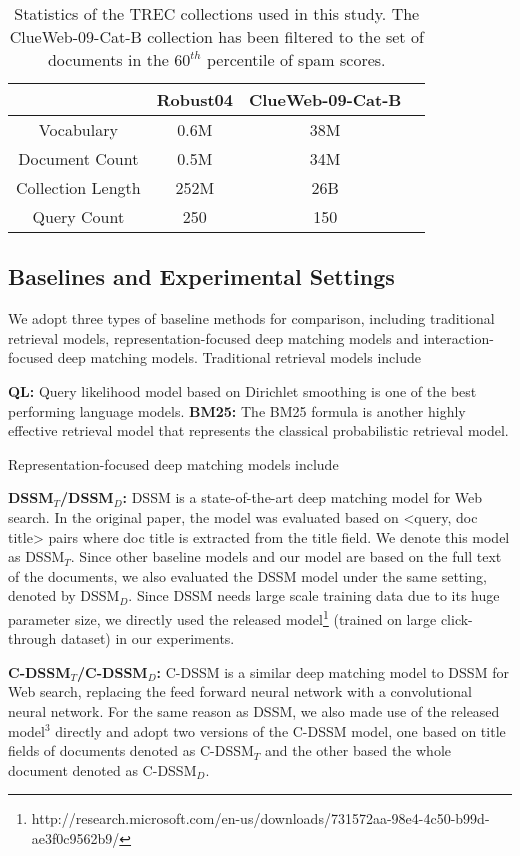 \documentclass{sig-alternate-05-2015}
\begin{document}
\begin{table}
  \centering
  \caption{Statistics of the TREC collections used in this study. The ClueWeb-09-Cat-B collection has been filtered to the set of documents in the $60^{th}$ percentile of spam scores.}
  \begin{tabular}{c c c c}
  \hline
    & Robust04 &   ClueWeb-09-Cat-B \\\hline
    Vocabulary & 0.6M & 38M  \\
    Document Count & 0.5M   & 34M  \\
    Collection Length & 252M  & 26B  \\
    Query Count & 250 & 150\\\hline
  \end{tabular}
  \label{tab:data_stats}
\end{table}

\subsection{Baselines and Experimental Settings}
We adopt three types of baseline methods for comparison, including traditional retrieval models, representation-focused deep matching models and interaction-focused deep matching models. Traditional retrieval models include

\textbf{QL:} Query likelihood model based on Dirichlet smoothing \cite{zhai2001study} is one of the best performing language models. 
\textbf{BM25:} The BM25 formula \cite{robertson1994some} is another highly effective retrieval model that represents the classical probabilistic retrieval model.

Representation-focused deep matching models include

\textbf{DSSM$_T$/DSSM$_D$:} DSSM \cite{huang2013learning} is a state-of-the-art deep matching model for Web search. In the original paper, the model was evaluated based on <query, doc title> pairs where doc title is extracted from the title field. We denote this model as DSSM$_T$. Since other baseline models and our model are based on the full text of the documents, we also evaluated the DSSM model under the same setting, denoted by DSSM$_D$. Since DSSM needs large scale training data due to its huge parameter size, we directly used the released model\footnote{http://research.microsoft.com/en-us/downloads/731572aa-98e4-4c50-b99d-ae3f0c9562b9/} (trained on large click-through dataset) in our experiments.

\textbf{C-DSSM$_T$/C-DSSM$_D$:} C-DSSM \cite{shen2014learning,gao2015modeling} is a similar deep matching model to DSSM for Web search, replacing the feed forward neural network with a convolutional neural network. For the same reason as DSSM, we also made use of the released model$^{3}$ directly and adopt two versions of the C-DSSM model, one based on title fields of documents denoted as C-DSSM$_T$ and the other based the whole document denoted as C-DSSM$_D$. 
\end{document}
